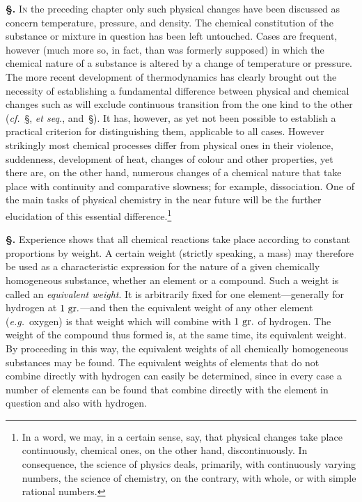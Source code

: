 \documentclass[12pt]{book}[2005/09/16]
\newcommand{\Section}[1]{
  \medskip\par\textbf{§\;#1}
  \label{section:#1}
}
\newcommand{\SecRef}[2][§\;]{\hyperref[section:#2.]{{\upshape #1#2}}}
\newcommand{\PageSep}[1]{\ignorespaces}
\newcommand{\eg}{\emph{e.g.}}
\renewcommand{\cf}{\emph{cf.}}
\newcommand{\First}[1]{\textsc{#1}}
\newcommand{\Unit}[1]{\text{\upshape #1}}
\begin{document}
\Section{33.} \First{In} the preceding chapter only such physical changes
have been discussed as concern temperature, pressure, and
density. The chemical constitution of the substance or
mixture in question has been left untouched. Cases are
frequent, however (much more so, in fact, than was formerly
supposed) in which the chemical nature of a substance is
altered by a change of temperature or pressure. The more
recent development of thermodynamics has clearly brought
out the necessity of establishing a fundamental difference
between physical and chemical changes such as will exclude
continuous transition from the one kind to the other (\cf\
\SecRef{42}, \textit{et seq.}, and~\SecRef{238}). It has, however, as yet not been
possible to establish a practical criterion for distinguishing
them, applicable to all cases. However strikingly most
chemical processes differ from physical ones in their violence,
suddenness, development of heat, changes of colour and
other properties, yet there are, on the other hand, numerous
changes of a chemical nature that take place with continuity
and comparative slowness; for example, dissociation. One
of the main tasks of physical chemistry in the near future
will be the further elucidation of this essential difference.\footnote
  {In a word, we may, in a certain sense, say, that physical changes take
  place continuously, chemical ones, on the other hand, discontinuously. In
  consequence, the science of physics deals, primarily, with continuously varying
  numbers, the science of chemistry, on the contrary, with whole, or with
  simple rational numbers.}

\Section{34.} Experience shows that all chemical reactions take
place according to constant proportions by weight. A
\PageSep{23}
%
certain weight (strictly speaking, a mass) may therefore
be used as a characteristic expression for the nature of
a given chemically homogeneous substance, whether an
element or a compound. Such a weight is called an \emph{equivalent
weight}. It is arbitrarily fixed for one element---generally
for hydrogen at $1~\Unit{gr.}$---and then the equivalent
weight of any other element (\eg~oxygen) is that weight
which will combine with $1~\Unit{gr.}$ of hydrogen. The weight of
the compound thus formed is, at the same time, its equivalent
weight. By proceeding in this way, the equivalent
weights of all chemically homogeneous substances may be
found. The equivalent weights of elements that do not
combine directly with hydrogen can easily be determined,
since in every case a number of elements can be found that
combine directly with the element in question and also
with hydrogen.
\end{document}
